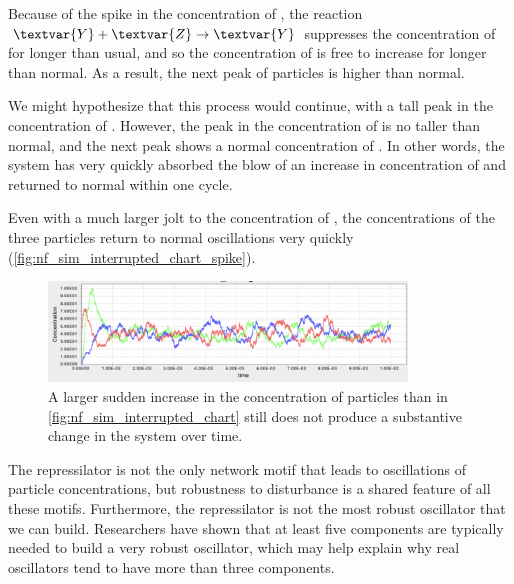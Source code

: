 Because of the spike in the concentration of , the reaction $\textvar{Y} + \textvar{Z} \rightarrow \textvar{Y}$ suppresses the concentration of  for longer than usual, and so the concentration of  is free to increase for longer than normal. As a result, the next peak of  particles is higher than normal.

We might hypothesize that this process would continue, with a tall peak in the concentration of . However, the peak in the concentration of  is no taller than normal, and the next peak shows a normal concentration of . In other words, the system has very quickly absorbed the blow of an increase in concentration of  and returned to normal within one cycle.

Even with a much larger jolt to the concentration of , the concentrations of the three particles return to normal oscillations very quickly (\autoref{fig:nf_sim_interrupted_chart_spike}).\\

\begin{figure}[h]
\centering
\mySfFamily
\includegraphics[width = 0.85\textwidth]{../images/nf_sim_interrupted_chart_spike.png}
\caption{A larger sudden increase in the concentration of  particles than in \autoref{fig:nf_sim_interrupted_chart} still does not produce a substantive change in the system over time.}
\label{fig:nf_sim_interrupted_chart_spike}
\end{figure}

The repressilator is not the only network motif that leads to oscillations of particle concentrations, but robustness to disturbance is a shared feature of all these motifs. Furthermore, the repressilator is not the most robust oscillator that we can build. Researchers have shown that at least five components are typically needed to build a very robust oscillator, which may help explain why real oscillators tend to have more than three components.


